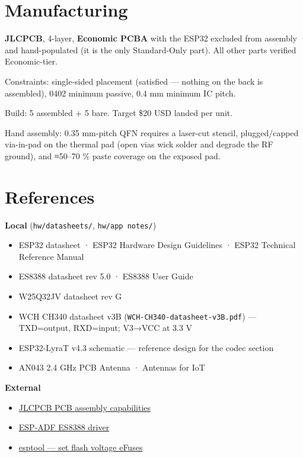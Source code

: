 \documentclass[11pt]{article}
\begin{document}
\section{Manufacturing}

\textbf{JLCPCB}, 4-layer, \textbf{Economic PCBA} with the ESP32 excluded from assembly and
hand-populated (it is the only Standard-Only part). All other parts verified Economic-tier.

Constraints: single-sided placement (satisfied — nothing on the back is assembled), 0402 minimum
passive, 0.4 mm minimum IC pitch.

Build: 5 assembled + 5 bare. Target \$20 USD landed per unit.

Hand assembly: 0.35 mm-pitch QFN requires a laser-cut stencil, plugged/capped via-in-pad on the
thermal pad (open vias wick solder and degrade the RF ground), and ≈50–70 \% paste coverage on the
exposed pad.

\section{References}

\textbf{Local} (\texttt{hw/datasheets/}, \texttt{hw/app notes/})
\begin{itemize}[leftmargin=1.4em]
\item ESP32 datasheet · ESP32 Hardware Design Guidelines · ESP32 Technical Reference Manual
\item ES8388 datasheet rev 5.0 · ES8388 User Guide
\item W25Q32JV datasheet rev G
\item WCH CH340 datasheet v3B (\texttt{WCH-CH340-datasheet-v3B.pdf}) — TXD=output, RXD=input; V3→VCC at 3.3 V
\item ESP32-LyraT v4.3 schematic — reference design for the codec section
\item AN043 2.4 GHz PCB Antenna · Antennas for IoT
\end{itemize}

\textbf{External}
\begin{itemize}[leftmargin=1.4em]
\item \href{https://jlcpcb.com/capabilities/pcb-assembly-capabilities}{JLCPCB PCB assembly capabilities}
\item \href{https://docs.espressif.com/projects/esp-adf/en/latest/api-reference/abstraction/es8388.html}{ESP-ADF ES8388 driver}
\item \href{https://docs.espressif.com/projects/esptool/en/latest/esp32/espefuse/set-flash-voltage-cmd.html}{esptool — set flash voltage eFuses}
\end{itemize}
\end{document}
